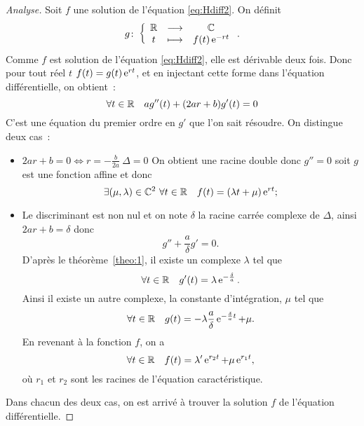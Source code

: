 \begin{proof}[Analyse] Soit \(f\) une solution de l'équation \eqref{eq:Hdiff2}. On définit
  \begin{equation}
    g\colon \left\{\begin{array}{ccc} \mathbb{R} & \longrightarrow &\mathbb{C}\\ t & \longmapsto & f(t)\operatorname{e}^{-rt} \end{array} \right..
  \end{equation}
  Comme \(f\) est solution de l'équation \eqref{eq:Hdiff2}, elle est dérivable deux fois. Donc pour tout réel \(t\) \(f(t)=g(t) \operatorname{e}^{rt}\), et en injectant cette forme dans l'équation différentielle, on obtient~:
\begin{equation}
  \forall t \in \mathbb{R} \quad ag''(t)+(2ar+b)g'(t)=0
\end{equation}
C'est une équation du premier ordre en \(g'\) que l'on sait résoudre. On distingue deux cas~:
\begin{itemize}
\item \(2ar+b=0 \iff r=-\frac{b}{2a} \ \Delta = 0\) On obtient une racine double donc \(g''=0\) soit \(g\) est une fonction affine et donc 
  \begin{equation}
   \exists (\mu,\lambda) \in \mathbb{C}^2 \ \forall t \in \mathbb{R} \quad f(t)=(\lambda t+\mu)\operatorname{e}^{rt};
  \end{equation}
\item Le discriminant est non nul et on note \(\delta\) la racine carrée complexe de \(\Delta\), ainsi \(2ar+b=\delta\) donc 
  \begin{equation}
    g''+\frac{a}{\delta} g'=0.
  \end{equation}
D'après le théorème~\ref{theo:1}, il existe un complexe \(\lambda\) tel que
\begin{equation}
  \forall t \in \mathbb{R} \quad g'(t)=\lambda \operatorname{e}^{-\frac{\delta}{a}}.
\end{equation}
Ainsi il existe un autre complexe, la constante d'intégration, \(\mu\) tel que
\begin{equation}
 \forall t \in \mathbb{R} \quad g(t)=-\lambda \frac{a}{\delta} \operatorname{e}^{-\frac{\delta}{a} t} + \mu. 
\end{equation}
En revenant à la fonction \(f\), on a
\begin{equation}
  \forall t \in \mathbb{R} \quad f(t)=\lambda' \operatorname{e}^{r_2 t} + \mu \operatorname{e}^{r_1 t},
\end{equation}
où \(r_1\) et \(r_2\) sont les racines de l'équation caractéristique.
\end{itemize}
Dans chacun des deux cas, on est arrivé à trouver la solution \(f\) de l'équation différentielle.
\end{proof}
